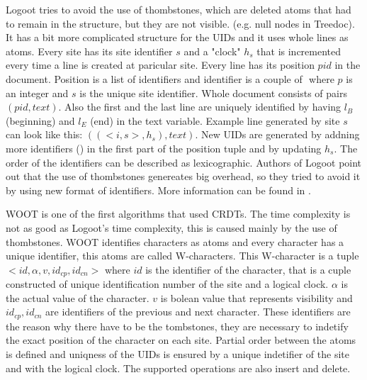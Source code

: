 \documentclass[12pt,oneside]{fithesis2}
\begin{document}
\par Logoot tries to avoid the use of thombstones, which are deleted atoms that had to remain in the structure, but they are not visible. (e.g. null nodes in Treedoc). It has a bit more complicated structure for the UIDs and it uses whole lines as atoms. Every site has its site identifier \(s\) and a "clock" \(h_s\) that is incremented every time a line is created at paricular site. Every line has its position \(pid\) in the document. Position is a list of identifiers and identifier is a couple of \(<p,s>\) where \(p\) is an integer and \(s\) is the unique site identifier. Whole document consists of pairs \((pid,text)\). Also the first and the last line are uniquely identified by having \(l_B\) (beginning) and \(l_E\) (end) in the text variable. Example line generated by site \(s\) can look like this: \( ((<i,s>,h_s),text) \). New UIDs are generated by addning more identifiers (\(<i,s>\)) in the first part of the position tuple and by updating \(h_s\). The order of the identifiers can be described as lexicographic. Authors of Logoot point out that the use of thombstones genereates big overhead, so they tried to avoid it by using new format of identifiers. More information can be found in \cite{Logoot}.
\par WOOT is one of the first algorithms that used CRDTs. The time complexity is not as good as Logoot's time complexity, this is caused mainly by the use of thombstones. WOOT identifies characters as atoms and every character has a unique identifier, this atoms are called W-characters. This W-character is a tuple \( <id,\alpha,v,id_{cp},id_{cn}> \) where \(id\) is the identifier of the character, that is a cuple constructed of unique identification number of the site and a logical clock. \(\alpha\) is the actual value of the character. \(v\) is bolean value that represents visibility and \( id_{cp}, id_{cn} \) are identifiers of the previous and next character. These identifiers are the reason why there have to be the tombstones, they are necessary to indetify the exact position of the character on each site. Partial order between the atoms is defined and uniqness of the UIDs is ensured by a unique indetifier of the site and with the logical clock. The supported operations are also insert and delete. 
\end{document}
